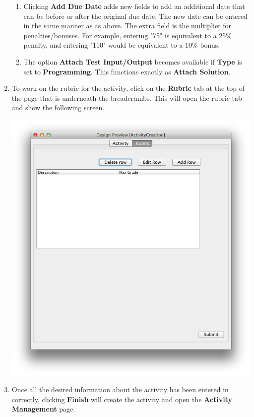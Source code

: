 \documentclass{article}
\begin{document}
\begin{enumerate}
\begin{enumerate}
  \item Clicking \textbf{Add Due Date} adds new fields to add an additional
    date that can be before or after the original due date. The new date can
    be entered in the same manner as as above. The extra field is the multiplier
    for penalties/bonuses. For example, entering "75" is equivalent to a 25\%
    penalty, and entering "110" would be equivalent to a 10\% bonus.
  \item The option \textbf{Attach Test Input/Output} becomes available if \textbf{Type} 
  is set to \textbf{Programming}. This functions exactly as \textbf{Attach Solution}.
 \end{enumerate}
 \item To work on the rubric for the activity, click on the \textbf{Rubric} tab at the 
 top of the page that is underneath the breadcrumbs. This will open the rubric tab and 
 show the following screen.
 \begin{center} 
	\includegraphics[scale=0.55]{../images/UpdatedUIScreens/RubricCreation.png}
 \end{center}
 \item Once all the desired information about the activity has been entered
   in correctly, clicking \textbf{Finish} will create the activity and open
   the \textbf{Activity Management} page.
\end{enumerate}
\end{document}
